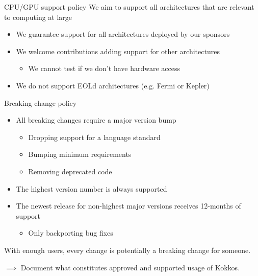 \begin{frame}[fragile]{CPU/GPU support policy}
We aim to support all architectures that are relevant to computing at large
\begin{itemize}
\item We guarantee support for all architectures deployed by our sponsors
\item We welcome contributions adding support for other architectures
  \begin{itemize}
  \item We cannot test if we don't have hardware access
  \end{itemize}
\item We do not support EOLd architectures (e.g. Fermi or Kepler)
\end{itemize}
\end{frame}

\begin{frame}[fragile]{Breaking change policy}


\begin{itemize}
\item All breaking changes require a major version bump
  \begin{itemize}
  \item Dropping support for a language standard
  \item Bumping minimum requirements
  \item Removing deprecated code
  \end{itemize}
\item The highest version number is always supported
\item The newest release for non-highest major versions receives 12-months of support
  \begin{itemize}
  \item Only backporting bug fixes
  \end{itemize}
\end{itemize}

\pause
With enough users, every change is potentially a breaking change for someone.

\pause
$\implies$ Document what constitutes approved and supported usage of Kokkos.
\end{frame}

